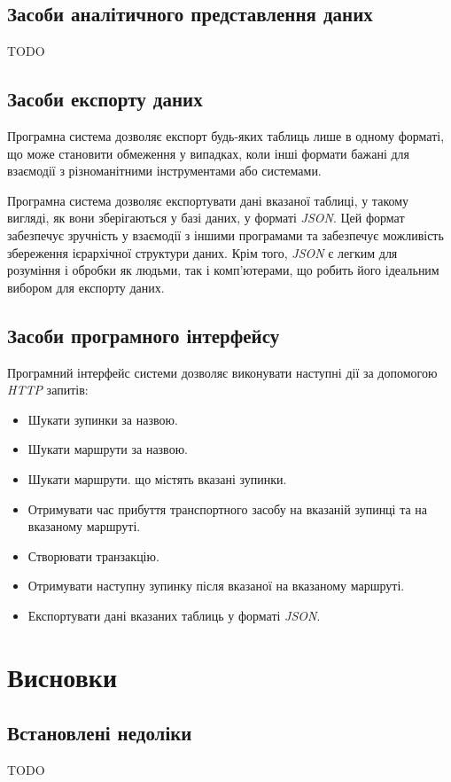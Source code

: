 \documentclass[oneside,14pt]{extarticle}
\begin{document}
\subsection{Засоби аналітичного представлення даних}
TODO

\subsection{Засоби експорту даних}
Програмна система дозволяє експорт будь-яких таблиць лише в одному форматі, що може становити обмеження у випадках, коли інші формати бажані для взаємодії з різноманітними інструментами або системами.

Програмна система дозволяє експортувати дані вказаної таблиці, у такому вигляді, як вони зберігаються у базі даних, у форматі \textit{JSON}. Цей формат забезпечує зручність у взаємодії з іншими програмами та забезпечує можливість збереження ієрархічної структури даних. Крім того, \textit{JSON} є легким для розуміння і обробки як людьми, так і комп'ютерами, що робить його ідеальним вибором для експорту даних.

\subsection{Засоби програмного інтерфейсу}
Програмний інтерфейс системи дозволяє виконувати наступні дії за допомогою \textit{HTTP} запитів:
\begin{itemize}
\item Шукати зупинки за назвою.
\item Шукати маршрути за назвою.
\item Шукати маршрути. що містять вказані зупинки.
\item Отримувати час прибуття транспортного засобу на вказаній зупинці та на вказаному маршруті.
\item Створювати транзакцію.
\item Отримувати наступну зупинку після вказаної на вказаному маршруті.
\item Експортувати дані вказаних таблиць у форматі \textit{JSON}.

\end{itemize}

\newpage

\section{Висновки}
\subsection{Встановлені недоліки}
TODO
\end{document}
